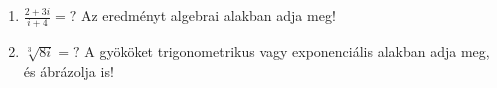 \documentclass[11pt]{scrartcl}
\begin{document}
\begin{enumerate}
	\item \(\displaystyle
	      \frac{2 + 3i}{i + 4} = ?
	      \) Az eredményt algebrai alakban adja meg!

	\item $\sqrt[3]{8i} = ?$ A gyököket trigonometrikus vagy exponenciális alakban
	      adja meg, és ábrázolja is!
\end{enumerate}
\end{document}
